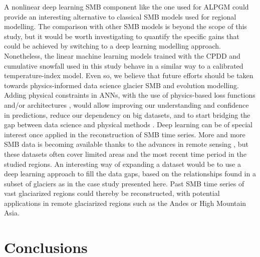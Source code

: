 A nonlinear deep learning SMB component like the one used for ALPGM could provide an interesting alternative to classical SMB models used for regional modelling. The comparison with other SMB models is beyond the scope of this study, but it would be worth investigating to quantify the specific gains that could be achieved by switching to a deep learning modelling approach. Nonetheless, the linear machine learning models trained with the CPDD and cumulative snowfall used in this study behave in a similar way to a calibrated temperature-index model. Even so, we believe that future efforts should be taken towards physics-informed data science glacier SMB and evolution modelling. Adding physical constraints in ANNs, with the use of physics-based loss functions and/or architectures \cite[e.g.,][]{karpatne_physics-guided_2018}, would allow improving our understanding and confidence in predictions, reduce our dependency on big datasets, and to start bridging the gap between data science and physical methods \citep{karpatne_theory-guided_2017, de_bezenac_deep_2018, lguensat_learning_2019, rackauckas_universal_2020}.  Deep learning can be of special interest once applied in the reconstruction of SMB time series. More and more SMB data is becoming available thanks to the advances in remote sensing \citep[e.g.,][]{brun_spatially_2017, zemp_global_2019, dussaillant_two_2019}, but these datasets often cover limited areas and the most recent time period in the studied regions. An interesting way of expanding a dataset would be to use a deep learning approach to fill the data gaps, based on the relationships found in a subset of glaciers as in the case study presented here. Past SMB time series of vast glaciarized regions could thereby be reconstructed, with potential applications in remote glaciarized regions such as the Andes or High Mountain Asia. 

\section{Conclusions} 

